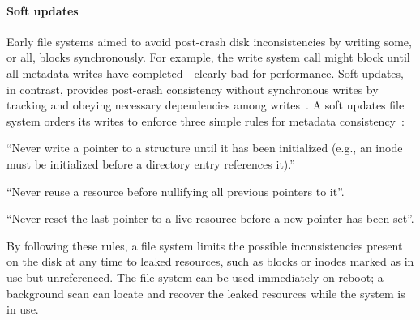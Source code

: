 \paragraph{Soft updates}
%
Early file systems aimed to avoid post-crash disk inconsistencies by
 writing some, or all, blocks synchronously.
%
For example, the write system call might block until all metadata writes
 have completed---clearly bad for performance.
%
Soft updates, in contrast, provides post-crash consistency without
 synchronous writes by tracking and obeying necessary dependencies among
 writes~\cite{ganger00soft}.
%
A soft updates file system orders its writes to enforce three simple rules
 for metadata consistency~\cite{ganger00soft}:

\begin{compactenumerate}
\item \label{rule:pointer} ``Never write a pointer to a structure until it
 has been initialized (e.g., an inode must be initialized before a
 directory entry references it).''
\item \label{rule:reuse} ``Never reuse a resource before nullifying all
 previous pointers to it''.
\item \label{rule:overwrite} ``Never reset the last pointer to a live
 resource before a new pointer has been set''.
\end{compactenumerate}

\noindent
By following these rules, a file system limits the possible inconsistencies
present on the disk at any time to leaked resources, such as blocks or inodes
marked as in use but unreferenced. The file system can be used immediately
 on reboot; a background scan can locate and recover the leaked resources
 while the system is in use.

